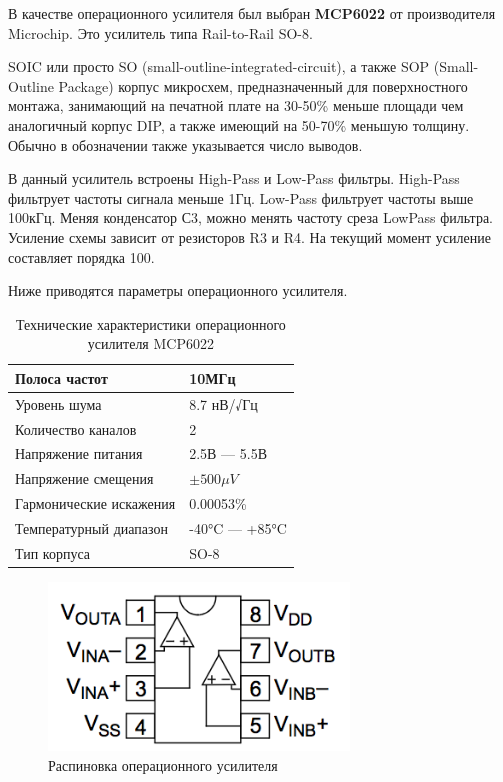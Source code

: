 \documentclass[../paper.tex]{subfiles}
\begin{document}
В качестве операционного усилителя был выбран \textbf{MCP6022} от производителя Microchip. Это усилитель типа Rail-to-Rail SO-8.

SOIC или просто SO (small-outline-integrated-circuit), а также SOP (Small-Outline Package) корпус микросхем, предназначенный для поверхностного монтажа, занимающий на печатной плате на 30-50\% меньше площади чем аналогичный корпус DIP, а также имеющий на 50-70\% меньшую толщину. Обычно в обозначении также указывается число выводов.

В данный усилитель встроены High-Pass и Low-Pass фильтры. High-Pass фильтрует частоты сигнала меньше 1Гц. Low-Pass фильтрует частоты выше 100кГц. Меняя конденсатор С3, можно менять частоту среза LowPass фильтра. Усиление схемы зависит от резисторов R3 и R4. На текущий момент усиление составляет порядка 100.

Ниже приводятся параметры операционного усилителя.

\begin{table}[h]
\centering
\label{my-label}
\begin{tabular}{|l|l|}
\hline
Полоса частот                  & 10МГц                      \\ \hline
Уровень шума                   & 8.7 нВ/√Гц                 \\ \hline
Количество каналов             & 2                          \\ \hline
Напряжение питания             & 2.5В --- 5.5В              \\ \hline
Напряжение смещения            & $\pm500\mu V $             \\ \hline
Гармонические искажения        & 0.00053\%                  \\ \hline
Температурный диапазон         & -40°C --- +85°C            \\ \hline
Тип корпуса                    & SO-8                       \\ \hline
\end{tabular}
\caption{Технические характеристики операционного усилителя MCP6022}
\end{table}

\begin{figure}[H]
\centering
\includegraphics[width=8cm]{images/op-amp.png}
\caption{Распиновка операционного усилителя}
\end{figure}
\end{document}
